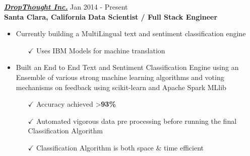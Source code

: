 \vspace{5pt}

{\sl \href{http://www.dropthought.com}{\textbf{DropThought Inc.}}} \hfill        Jan 2014 - Present \\
{\textbf{Santa Clara, California}}       \hfill   \textbf{ Data Scientist / Full Stack Engineer}
 \begin{itemize} \itemsep -2pt %
 \item Currently building a MultiLingual text and sentiment classification engine\itemsep -2pt
   \begin{itemize}
     \item[$\checkmark$]  \itemsep -8pt%
  Uses IBM Models for machine translation \\
      \end{itemize} 
            \end{itemize} 

   \begin{itemize} \itemsep -2pt %
 \item Built an End to End Text and Sentiment Classification Engine using an Ensemble of various strong machine learning algorithms and voting mechanisms on feedback using scikit-learn and Apache Spark MLlib \itemsep -2pt
   \begin{itemize}
     \item[$\checkmark$]  \itemsep -8pt%
   Accuracy achieved  \textgreater {\bf93\%}\\
     \item[$\checkmark$]  \itemsep -8pt%
  Automated vigorous data pre processing before running the final Classification Algorithm\\
        \item[$\checkmark$]  \itemsep -8pt%
   Classification Algorithm is both space \& time efficient\\
      \end{itemize} 
            \end{itemize} 


